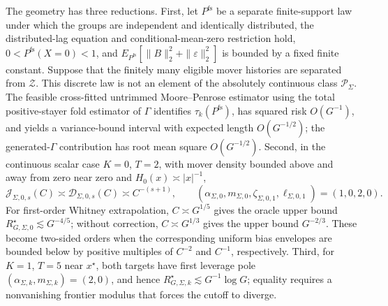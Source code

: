 The geometry has three reductions. First, let \(P^{\mathrm{fs}}\) be a separate finite-support law under which the groups are independent and identically distributed, the distributed-lag equation and conditional-mean-zero restriction hold, \(0<P^{\mathrm{fs}}(X=0)<1\), and \(E_{P^{\mathrm{fs}}}[\|B\|_2^2+\|\varepsilon\|_2^2]\) is bounded by a fixed finite constant. Suppose that the finitely many eligible mover histories are separated from \(\mathcal Z\). This discrete law is not an element of the absolutely continuous class \(\mathcal P_\Sigma\). The feasible cross-fitted untrimmed Moore--Penrose estimator using the total positive-stayer fold estimator of \(\Gamma\) identifies \(\tau_k(P^{\mathrm{fs}})\), has squared risk \(O(G^{-1})\), and yields a variance-bound interval with expected length \(O(G^{-1/2})\); the generated-\(\Gamma\) contribution has root mean square \(O(G^{-1/2})\). Second, in the continuous scalar case \(K=0\), \(T=2\), with mover density bounded above and away from zero near zero and \(H_0(x)\asymp|x|^{-1}\), \[\mathcal J_{\Sigma,0,s}(C)\asymp\mathcal D_{\Sigma,0,s}(C)\asymp C^{-(s+1)},\qquad (\alpha_{\Sigma,0},m_{\Sigma,0},\zeta_{\Sigma,0,1},\ell_{\Sigma,0,1})=(1,0,2,0).\] For first-order Whitney extrapolation, \(C\asymp G^{1/5}\) gives the oracle upper bound \(R_{G,\Sigma,0}^{\star}\lesssim G^{-4/5}\); without correction, \(C\asymp G^{1/3}\) gives the upper bound \(G^{-2/3}\). These become two-sided orders when the corresponding uniform bias envelopes are bounded below by positive multiples of \(C^{-2}\) and \(C^{-1}\), respectively. Third, for \(K=1\), \(T=5\) near \(x^\star\), both targets have first leverage pole \((\alpha_{\Sigma,k},m_{\Sigma,k})=(2,0)\), and hence \(R_{G,\Sigma,k}^{\star}\lesssim G^{-1}\log G\); equality requires a nonvanishing frontier modulus that forces the cutoff to diverge.